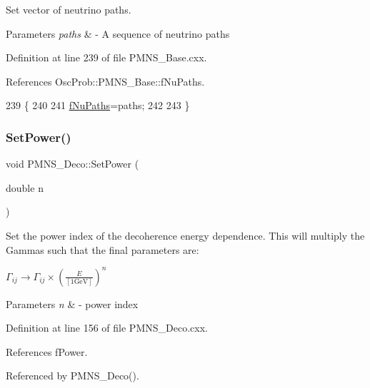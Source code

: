 Set vector of neutrino paths. 
\begin{DoxyParams}{Parameters}
{\em paths} & -\/ A sequence of neutrino paths \\
\hline
\end{DoxyParams}


Definition at line 239 of file P\+M\+N\+S\+\_\+\+Base.\+cxx.



References Osc\+Prob\+::\+P\+M\+N\+S\+\_\+\+Base\+::f\+Nu\+Paths.


\begin{DoxyCode}
239                                               \{
240 
241   \hyperlink{classOscProb_1_1PMNS__Base_a69db9d57e12fc7cbe0431bc6c18fac93}{fNuPaths}=paths;
242 
243 \}
\end{DoxyCode}
\mbox{\label{classOscProb_1_1PMNS__Deco_afe7b8b9ae438d8b207bf75c2cfbb9fb8}} 
\subsubsection{\texorpdfstring{Set\+Power()}{SetPower()}}
{\footnotesize\ttfamily void P\+M\+N\+S\+\_\+\+Deco\+::\+Set\+Power (\begin{DoxyParamCaption}\item[{double}]{n }\end{DoxyParamCaption})\hspace{0.3cm}{\ttfamily [virtual]}}

Set the power index of the decoherence energy dependence. This will multiply the Gammas such that the final parameters are\+:

$ \Gamma_{ij} \rightarrow \Gamma_{ij} \times \left(\frac{E}{[1 \mbox{GeV}]}\right)^n $


\begin{DoxyParams}{Parameters}
{\em n} & -\/ power index \\
\hline
\end{DoxyParams}


Definition at line 156 of file P\+M\+N\+S\+\_\+\+Deco.\+cxx.



References f\+Power.



Referenced by P\+M\+N\+S\+\_\+\+Deco().


